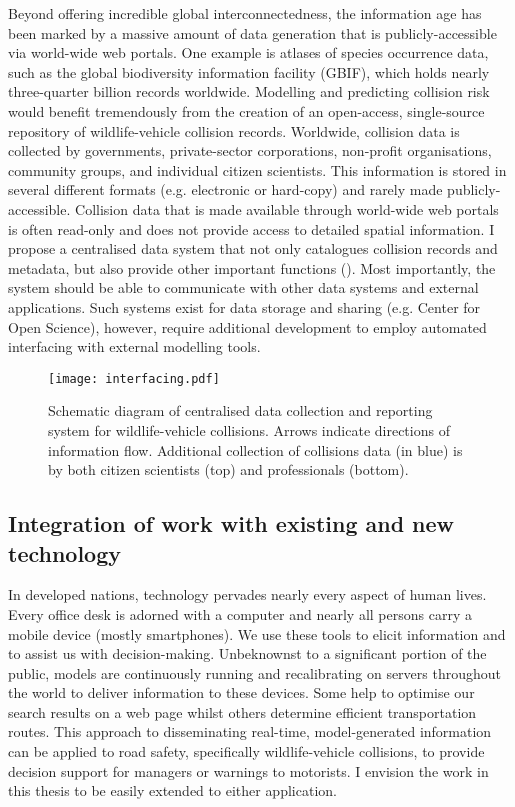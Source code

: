 Beyond offering incredible global interconnectedness, the information age has been marked by a massive amount of data generation that is publicly-accessible via world-wide web portals. One example is atlases of species occurrence data, such as the global biodiversity information facility (GBIF), which holds nearly three-quarter billion records worldwide. Modelling and predicting collision risk would benefit tremendously from the creation of an open-access, single-source repository of wildlife-vehicle collision records. Worldwide, collision data is collected by governments, private-sector corporations, non-profit organisations, community groups, and individual citizen scientists. This information is stored in several different formats (e.g. electronic or hard-copy) and rarely made publicly-accessible. Collision data that is made available through world-wide web portals is often read-only and does not provide access to detailed spatial information. I propose a centralised data system that not only catalogues collision records and metadata, but also provide other important functions (). Most importantly, the system should be able to communicate with other data systems and external applications. Such systems exist for data storage and sharing (e.g. Center for Open Science), however, require additional development to employ automated interfacing with external modelling tools.

\begin{figure*}[htp]
  \centering
  \texttt{[image: interfacing.pdf]}
  \caption[Centralised data collection and reporting system]{Schematic diagram of centralised data collection and reporting system for wildlife-vehicle collisions. Arrows indicate directions of information flow. Additional collection of collisions data (in blue) is by both citizen scientists (top) and professionals (bottom).}
  \label{wvc_server}
\end{figure*}

\subsection{Integration of work with existing and new technology}

In developed nations, technology pervades nearly every aspect of human lives. Every office desk is adorned with a computer and nearly all persons carry a mobile device (mostly smartphones). We use these tools to elicit information and to assist us with decision-making. Unbeknownst to a significant portion of the public, models are continuously running and recalibrating on servers throughout the world to deliver information to these devices. Some help to optimise our search results on a web page whilst others determine efficient transportation routes. This approach to disseminating real-time, model-generated information can be applied to road safety, specifically wildlife-vehicle collisions, to provide decision support for managers or warnings to motorists. I envision the work in this thesis to be easily extended to either application.

